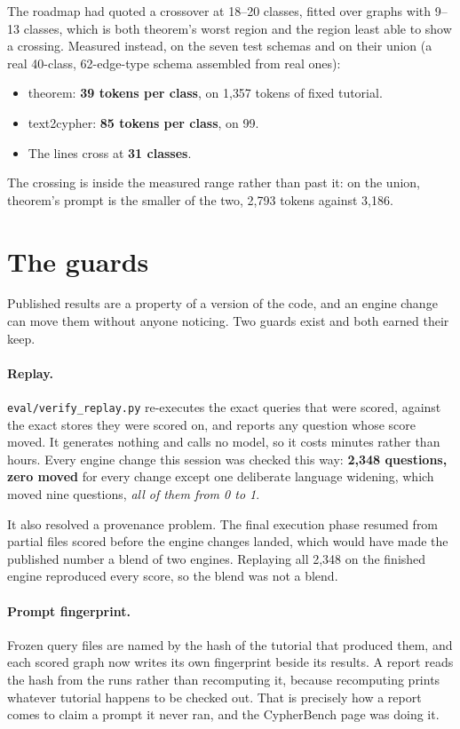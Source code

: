 \documentclass[11pt]{article}
\begin{document}
The roadmap had quoted a crossover at 18--20 classes, fitted over graphs with
9--13 classes, which is both theorem's worst region and the region least able to
show a crossing. Measured instead, on the seven test schemas and on their union
(a real 40-class, 62-edge-type schema assembled from real ones):

\begin{itemize}
  \item theorem: \textbf{39 tokens per class}, on 1{,}357 tokens of fixed tutorial.
  \item text2cypher: \textbf{85 tokens per class}, on 99.
  \item The lines cross at \textbf{31 classes}.
\end{itemize}

The crossing is inside the measured range rather than past it: on the union,
theorem's prompt is the smaller of the two, 2{,}793 tokens against 3{,}186.

\section{The guards}

Published results are a property of a version of the code, and an engine change
can move them without anyone noticing. Two guards exist and both earned their
keep.

\paragraph{Replay.} \texttt{eval/verify\_replay.py} re-executes the exact queries
that were scored, against the exact stores they were scored on, and reports any
question whose score moved. It generates nothing and calls no model, so it costs
minutes rather than hours. Every engine change this session was checked this way:
\textbf{2{,}348 questions, zero moved} for every change except one deliberate
language widening, which moved nine questions, \emph{all of them from 0 to 1}.

It also resolved a provenance problem. The final execution phase resumed from
partial files scored before the engine changes landed, which would have made the
published number a blend of two engines. Replaying all 2{,}348 on the finished
engine reproduced every score, so the blend was not a blend.

\paragraph{Prompt fingerprint.} Frozen query files are named by the hash of the
tutorial that produced them, and each scored graph now writes its own fingerprint
beside its results. A report reads the hash from the runs rather than recomputing
it, because recomputing prints whatever tutorial happens to be checked out. That
is precisely how a report comes to claim a prompt it never ran, and the
CypherBench page was doing it.
\end{document}
